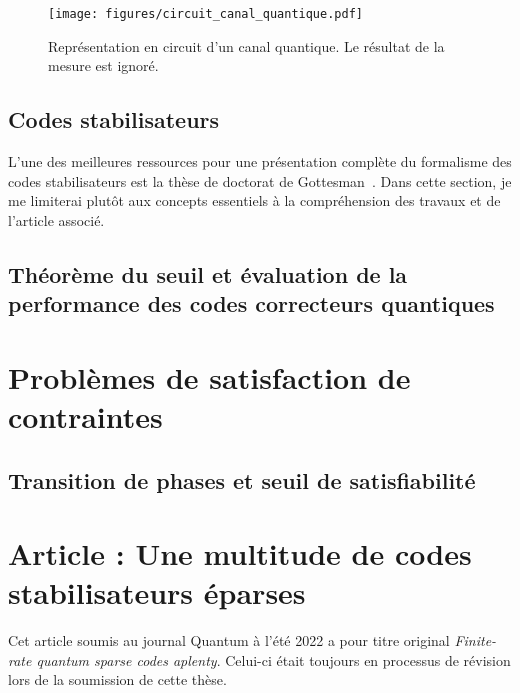 \begin{figure}
  \begin{center}
    \texttt{[image: figures/circuit\_canal\_quantique.pdf]}
  \end{center}
  \caption[Représentation en circuit d'un canal quantique]{
    Représentation en circuit d'un canal quantique.
    Le résultat de la mesure est ignoré.
  }
  \label{fig:circuit_canal_quantique}
\end{figure}




\subsection{Codes stabilisateurs}

L'une des meilleures ressources pour une présentation complète du formalisme des codes
stabilisateurs est la thèse de doctorat de Gottesman~\cite{gottesman_stabilizer_1997}.
Dans cette section,
je me limiterai plutôt aux concepts essentiels à la compréhension des travaux et de l'article associé.



\subsection{Théorème du seuil et évaluation de la performance des codes correcteurs quantiques}




\section{Problèmes de satisfaction de contraintes}
\subsection{Transition de phases et seuil de satisfiabilité}

\section{Article : Une multitude de codes stabilisateurs éparses}

Cet article soumis au journal Quantum à l'été 2022 a pour titre original
\textit{Finite-rate quantum sparse codes aplenty}.
Celui-ci était toujours en processus de révision lors de la soumission de cette thèse.


